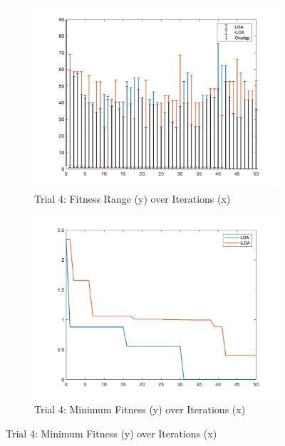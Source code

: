 \begin{figure}
  \begin{subfigure}[b]{0.4\textwidth}
    \includegraphics[width=\textwidth]{img/bars/f4/4}
    \caption{ \scriptsize Trial 4: Fitness Range (y) over Iterations (x)}
    \label{fig:f4-b-4}
  \end{subfigure}
  \begin{subfigure}[b]{0.4\textwidth}
    \includegraphics[width=\textwidth]{img/fits/f4/4}
    \caption{ \scriptsize Trial 4: Minimum Fitness (y) over Iterations (x)}
    \label{fig:f4-f-4}
  \end{subfigure}


\end{figure}
